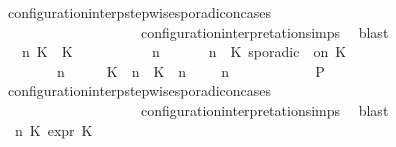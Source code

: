 \begin{isabellebody}
\ configuration{\isacharunderscore}interp{\isacharunderscore}stepwise{\isacharunderscore}sporadicon{\isacharunderscore}cases\isanewline
\ \ \ \ \ \ \ \ \ \ \ \ \ \ \ \ \ \ \ \ configuration{\isacharunderscore}interpretation{\isachardot}simps\ \isamarkupfalse%
\ blast\isanewline
\ \ \ \ \isamarkupfalse%
\isanewline
\ \ \ \ \ \ \isamarkupfalse%
\ \ {\isasymGamma}\ n\ K\ {\isasymtau}\ K\ {\isasymPsi}\ {\isasymPhi}\isanewline
\ \ \ \ \ \ \isamarkupfalse%
\ {\isacartoucheopen}{\isacharparenleft}{\isasymGamma}\ n\ {\isasymturnstile}\ {\isasymPsi}\ {\isasymtriangleright}\ {\isasymPhi}\ {\isacharequal}\ {\isacharparenleft}{\isasymGamma}{\isacharcomma}\ n\ {\isasymturnstile}\ {\isacharparenleft}K\ sporadic\ {\isasymtau}\ on\ K\ {\isacharhash}\ {\isasymPsi}\ {\isasymtriangleright}\ {\isasymPhi}{\isacharparenright}{\isacartoucheclose}\isanewline
\ \ \ \ \ \ \ {\isacartoucheopen}{\isacharparenleft}{\isasymGamma}\ n\ {\isasymturnstile}\ {\isasymPsi}\ {\isasymtriangleright}\ {\isasymPhi}\ {\isacharequal}\ {\isacharparenleft}{\isacharparenleft}{\isacharparenleft}K\ {\isasymUp}\ n{\isacharparenright}\ {\isacharhash}\ {\isacharparenleft}K\ {\isasymDown}\ n\ {\isacharat}\ {\isasymtau}{\isacharparenright}\ {\isacharhash}\ {\isasymGamma}{\isacharparenright}{\isacharcomma}\ n\ {\isasymturnstile}\ {\isasymPsi}\ {\isasymtriangleright}\ {\isasymPhi}{\isacharparenright}{\isacartoucheclose}\isanewline
\ \ \ \ \ \ \isamarkupfalse%
\ {\isacharquery}P\ \isamarkupfalse%
\ configuration{\isacharunderscore}interp{\isacharunderscore}stepwise{\isacharunderscore}sporadicon{\isacharunderscore}cases\isanewline
\ \ \ \ \ \ \ \ \ \ \ \ \ \ \ \ \ \ \ \ configuration{\isacharunderscore}interpretation{\isachardot}simps\ \isamarkupfalse%
\ blast\isanewline
\ \ \ \ \isamarkupfalse%
\isanewline
\ \ \ \ \ \ \isamarkupfalse%
\ {\isasymGamma}\ n\ K\ {\isasymtau}\isactrlsub e\isactrlsub x\isactrlsub p\isactrlsub r\ K\ {\isasymPsi}\ {\isasymPhi}\isanewline

\end{isabellebody}
